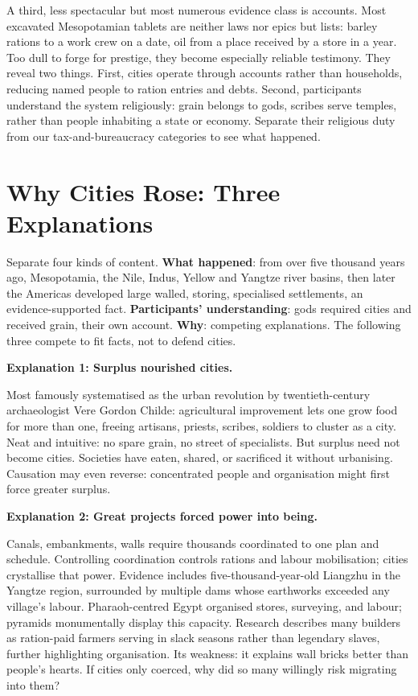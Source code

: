 A third, less spectacular but most numerous evidence class is accounts. Most excavated Mesopotamian tablets are neither laws nor epics but lists: barley rations to a work crew on a date, oil from a place received by a store in a year. Too dull to forge for prestige, they become especially reliable testimony. They reveal two things. First, cities operate through accounts rather than households, reducing named people to ration entries and debts. Second, participants understand the system religiously: grain belongs to gods, scribes serve temples, rather than people inhabiting a state or economy. Separate their religious duty from our tax-and-bureaucracy categories to see what happened.

\section{Why Cities Rose: Three Explanations}
Separate four kinds of content. \textbf{What happened}: from over five thousand years ago, Mesopotamia, the Nile, Indus, Yellow and Yangtze river basins, then later the Americas developed large walled, storing, specialised settlements, an evidence-supported fact. \textbf{Participants' understanding}: gods required cities and received grain, their own account. \textbf{Why}: competing explanations. The following three compete to fit facts, not to defend cities.

\textbf{Explanation 1: Surplus nourished cities.}

Most famously systematised as the urban revolution by twentieth-century archaeologist Vere Gordon Childe: agricultural improvement lets one grow food for more than one, freeing artisans, priests, scribes, soldiers to cluster as a city. Neat and intuitive: no spare grain, no street of specialists. But surplus need not become cities. Societies have eaten, shared, or sacrificed it without urbanising. Causation may even reverse: concentrated people and organisation might first force greater surplus.

\textbf{Explanation 2: Great projects forced power into being.}

Canals, embankments, walls require thousands coordinated to one plan and schedule. Controlling coordination controls rations and labour mobilisation; cities crystallise that power. Evidence includes five-thousand-year-old Liangzhu in the Yangtze region, surrounded by multiple dams whose earthworks exceeded any village's labour. Pharaoh-centred Egypt organised stores, surveying, and labour; pyramids monumentally display this capacity. Research describes many builders as ration-paid farmers serving in slack seasons rather than legendary slaves, further highlighting organisation. Its weakness: it explains wall bricks better than people's hearts. If cities only coerced, why did so many willingly risk migrating into them?

